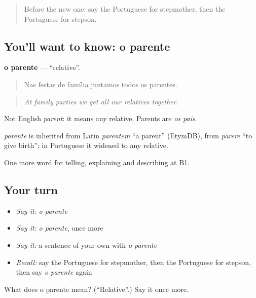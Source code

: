 \label{lesson:PT-C492-parente}



\begin{quote}
Before the new one: say the Portuguese for stepmother, then the Portuguese for stepson.
\end{quote}

\subsection*{You'll want to know: o parente}
\textbf{o parente} — \textquotedblleft{}relative\textquotedblright{}.

\begin{quote}
Nas festas de família juntamos todos os parentes.
\end{quote}

\begin{quote}
\emph{At family parties we get all our relatives together.}
\end{quote}

Not English \emph{parent}: it means any relative. Parents are \emph{os pais}.

\begin{cousinweb}
\emph{parente} is inherited from Latin \emph{parentem} \textquotedblleft{}a parent\textquotedblright{} (EtymDB), from \emph{parere} \textquotedblleft{}to give birth\textquotedblright{}; in Portuguese it widened to any relative.
\end{cousinweb}

\begin{grammarlens}[title={What you've built}]
One more word for telling, explaining and describing at B1.
\end{grammarlens}

\subsection*{Your turn}
\begin{itemize}
\raggedright
  \item \emph{Say it:} \emph{o parente}
  \item \emph{Say it:} \emph{o parente}, once more
  \item \emph{Say it:} a sentence of your own with \emph{o parente}
  \item \emph{Recall:} say the Portuguese for stepmother, then the Portuguese for stepson, then say \emph{o parente} again
\end{itemize}

\begin{tcolorbox}[breakable,colback=teal!4,colframe=teal!35!black,title={Before you move on}]
What does o parente mean? (\textquotedblleft{}Relative\textquotedblright{}.) Say it once more.
\end{tcolorbox}
